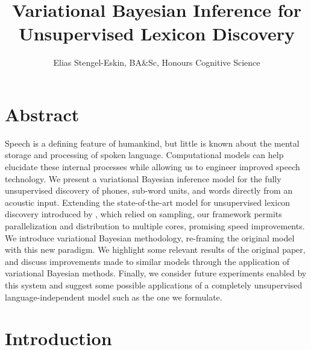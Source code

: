 \documentclass[12pt,letterpaper]{article}
\title{\vspace{-1.5cm} Variational Bayesian Inference for Unsupervised Lexicon Discovery}
\author{Elias Stengel-Eskin, BA\&Sc, Honours Cognitive Science}
\begin{document}
\maketitle

\section{Abstract}

Speech is a defining feature of humankind, but little is known about the mental storage and processing of spoken language. Computational models can help elucidate these internal processes while allowing us to engineer improved speech technology. We present a variational Bayesian inference model for the fully unsupervised discovery of phones, sub-word units, and words directly from an acoustic input. Extending the state-of-the-art model for unsupervised lexicon discovery introduced by \citet{lee:2015}, which relied on sampling, our framework permits  parallelization and distribution to multiple cores, promising speed improvements. We introduce variational Bayesian methodology, re-framing the original model with this new paradigm. We highlight some relevant results of the original paper, and discuss improvements made to similar models through the application of variational Bayesian methods. Finally, we consider future experiments enabled by this system and suggest some possible applications of a completely unsupervised language-independent model such as the one we formulate. 

\section{Introduction}
\end{document}
